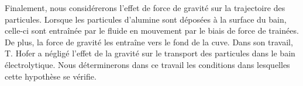 Finalement, nous considérerons l'effet de force de gravité sur la
trajectoire des particules. Lorsque les particules d'alumine sont
déposées à la surface du bain, celle-ci sont entraînée par le fluide
en mouvement par le biais de force de trainées. De plus, la force de
gravité les entraîne vers le fond de la cuve. Dans son travail,
T. Hofer \cite{Hofer2011} a négligé l'effet de la gravité sur le
transport des particules dans le bain électrolytique. Nous
déterminerons dans ce travail les conditions dans lesquelles cette
hypothèse se vérifie.






